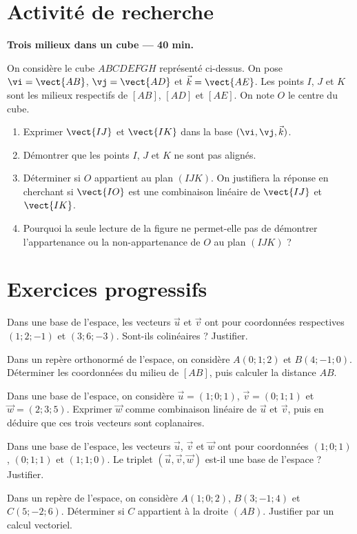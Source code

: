 \section{Activité de recherche}\textbf{Trois milieux dans un cube --- 40 min.}\par On considère le cube $ABCDEFGH$ représenté ci-dessus. On pose $\vi=\vect{AB}$, $\vj=\vect{AD}$ et $\vec k=\vect{AE}$. Les points $I$, $J$ et $K$ sont les milieux respectifs de $[AB]$, $[AD]$ et $[AE]$. On note $O$ le centre du cube.
\begin{enumerate}\item Exprimer $\vect{IJ}$ et $\vect{IK}$ dans la base $(\vi,\vj,\vec k)$.
\item Démontrer que les points $I$, $J$ et $K$ ne sont pas alignés.
\item Déterminer si $O$ appartient au plan $(IJK)$. On justifiera la réponse en cherchant si $\vect{IO}$ est une combinaison linéaire de $\vect{IJ}$ et $\vect{IK}$.
\item Pourquoi la seule lecture de la figure ne permet-elle pas de démontrer l'appartenance ou la non-appartenance de $O$ au plan $(IJK)$ ?\end{enumerate}

\section{Exercices progressifs}

Dans une base de l'espace, les vecteurs $\vec u$ et $\vec v$ ont pour coordonnées respectives $(1;2;-1)$ et $(3;6;-3)$. Sont-ils colinéaires ? Justifier.

Dans un repère orthonormé de l'espace, on considère $A(0;1;2)$ et $B(4;-1;0)$. Déterminer les coordonnées du milieu de $[AB]$, puis calculer la distance $AB$.

Dans une base de l'espace, on considère $\vec u=(1;0;1)$, $\vec v=(0;1;1)$ et $\vec w=(2;3;5)$. Exprimer $\vec w$ comme combinaison linéaire de $\vec u$ et $\vec v$, puis en déduire que ces trois vecteurs sont coplanaires.

Dans une base de l'espace, les vecteurs $\vec u$, $\vec v$ et $\vec w$ ont pour coordonnées $(1;0;1)$, $(0;1;1)$ et $(1;1;0)$. Le triplet $(\vec u,\vec v,\vec w)$ est-il une base de l'espace ? Justifier.

Dans un repère de l'espace, on considère $A(1;0;2)$, $B(3;-1;4)$ et $C(5;-2;6)$. Déterminer si $C$ appartient à la droite $(AB)$. Justifier par un calcul vectoriel.

